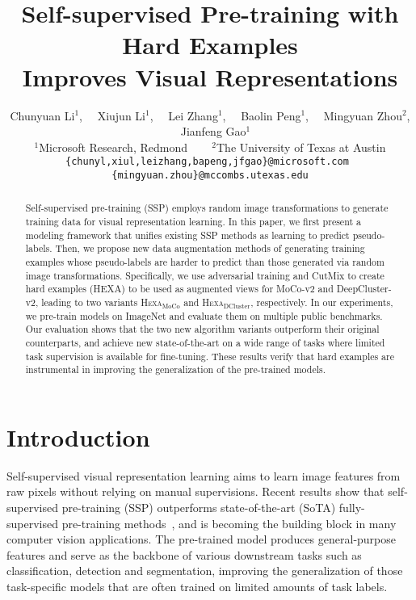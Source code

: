 \documentclass[10pt,twocolumn,letterpaper]{article}
\newcommand{\shortname}{\textsc{Hexa}}
\begin{document}
\title{Self-supervised Pre-training with Hard Examples\\ Improves Visual Representations}

\author{
Chunyuan Li$^{1}$,  ~~Xiujun Li$^{1}$,  ~~Lei Zhang$^{1}$,  ~~Baolin Peng$^{1}$, ~~Mingyuan Zhou$^{2}$,  ~~Jianfeng Gao$^{1}$ \\  $^{1}$Microsoft Research, Redmond ~~~  $^{2}$The University of Texas at Austin\\
{\tt\small   \{chunyl,xiul,leizhang,bapeng,jfgao\}@microsoft.com~ \{mingyuan.zhou\}@mccombs.utexas.edu}
}

\maketitle


\begin{abstract}



Self-supervised pre-training (SSP) employs random image transformations to generate training data for visual representation learning. In this paper, we first present a modeling framework that unifies existing SSP methods as learning to predict pseudo-labels. Then, we propose new data augmentation methods of generating training examples whose pseudo-labels are harder to predict than those generated via random image transformations. Specifically, we use adversarial training and CutMix to create hard examples (HEXA) to be used as augmented views for MoCo-v2 and DeepCluster-v2, leading to two variants \shortname{}$_{\text{MoCo}}$ and \shortname{}$_{\text{DCluster}}$, respectively. In our experiments, we pre-train models on ImageNet and evaluate them on multiple public benchmarks. Our evaluation shows that the two new algorithm variants outperform their original counterparts, and achieve new state-of-the-art on a wide range of tasks where limited task supervision is available for fine-tuning. These results verify that hard examples are instrumental in improving the generalization of the pre-trained models.    





\end{abstract}

\section{Introduction}

Self-supervised visual representation learning aims to learn image features from raw pixels without relying on 
manual supervisions.
Recent results show that self-supervised pre-training (SSP) outperforms state-of-the-art (SoTA) fully-supervised pre-training methods~\cite{he2020momentum,caron2020unsupervised}, and is becoming
the building block in many computer vision applications.
The pre-trained model produces general-purpose features and serve as the backbone of various downstream tasks such as classification, detection and segmentation, improving the generalization of those task-specific models that are often trained on limited amounts of task labels. 
\end{document}

